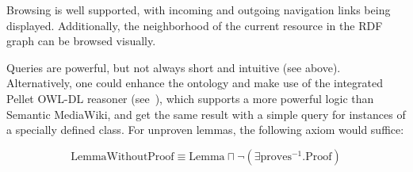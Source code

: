 Browsing is well supported, with incoming and outgoing navigation links being
displayed.  Additionally, the neighborhood of the current resource in the RDF
graph can be browsed visually.

Queries are powerful, but not always short and intuitive (see above).
Alternatively, one could enhance the ontology and make use of the integrated
Pellet OWL-DL reasoner (see~\cite{KrSchVr:semwiki-reasoning07}), which
supports a more powerful logic than Semantic MediaWiki, and get the same result
with a simple query for instances of a specially defined class.  For unproven
lemmas, the following axiom would suffice:

\[
\mbox{LemmaWithoutProof}\equiv\mbox{Lemma}\sqcap\neg(\exists\mbox{proves}^{-1}.\mbox{Proof})
\]

